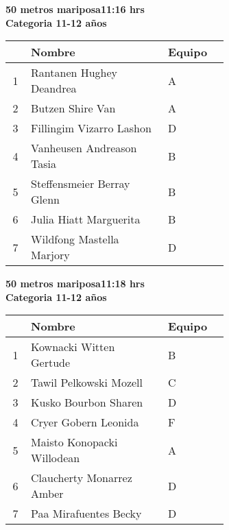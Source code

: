 \begin{minipage}{0.95\linewidth}\vspace{0.5cm} 
\begin{flushleft}
\textbf{
\hspace{-0.15cm}50 metros mariposa\hspace{1.5cm}11:16 hrs \\Categoria 11-12 años}\vspace{-0.2cm} 
\end{flushleft}
\begin{tabular}{cp{0.63\linewidth}l}
\hline
& \textbf{Nombre} & \textbf{Equipo} \\ \hline
1 & Rantanen Hughey Deandrea & A \\ 
2 & Butzen Shire Van & A \\ 
3 & Fillingim Vizarro Lashon & D \\ 
4 & Vanheusen Andreason Tasia & B \\ 
5 & Steffensmeier Berray Glenn & B \\ 
6 & Julia Hiatt Marguerita & B \\ 
7 & Wildfong Mastella Marjory & D \\ 
\end{tabular}
\end{minipage}
\begin{minipage}{0.95\linewidth}\vspace{0.5cm} 
\begin{flushleft}
\textbf{
\hspace{-0.15cm}50 metros mariposa\hspace{1.5cm}11:18 hrs \\Categoria 11-12 años}\vspace{-0.2cm} 
\end{flushleft}
\begin{tabular}{cp{0.63\linewidth}l}
\hline
& \textbf{Nombre} & \textbf{Equipo} \\ \hline
1 & Kownacki Witten Gertude & B \\ 
2 & Tawil Pelkowski Mozell & C \\ 
3 & Kusko Bourbon Sharen & D \\ 
4 & Cryer Gobern Leonida & F \\ 
5 & Maisto Konopacki Willodean & A \\ 
6 & Claucherty Monarrez Amber & D \\ 
7 & Paa Mirafuentes Becky & D \\ 
\end{tabular}
\end{minipage}
